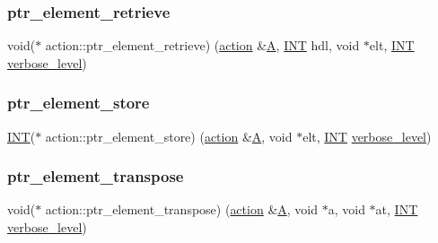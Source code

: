 \subsubsection{\texorpdfstring{ptr\+\_\+element\+\_\+retrieve}{ptr\_element\_retrieve}}
{\footnotesize\ttfamily void($\ast$ action\+::ptr\+\_\+element\+\_\+retrieve) (\mbox{\hyperlink{classaction}{action}} \&\mbox{\hyperlink{simeon_8_c_a97833f04c3a9c008df5521a2fc291bb4}{A}}, \mbox{\hyperlink{galois_8h_a09fddde158a3a20bd2dcadb609de11dc}{I\+NT}} hdl, void $\ast$elt, \mbox{\hyperlink{galois_8h_a09fddde158a3a20bd2dcadb609de11dc}{I\+NT}} \mbox{\hyperlink{simeon_8_c_a818073fbcc2f439e7c56952f67386122}{verbose\+\_\+level}})}

\mbox{\label{classaction_af0d51728258739fb3545b462159c4d1b}} 
\subsubsection{\texorpdfstring{ptr\+\_\+element\+\_\+store}{ptr\_element\_store}}
{\footnotesize\ttfamily \mbox{\hyperlink{galois_8h_a09fddde158a3a20bd2dcadb609de11dc}{I\+NT}}($\ast$ action\+::ptr\+\_\+element\+\_\+store) (\mbox{\hyperlink{classaction}{action}} \&\mbox{\hyperlink{simeon_8_c_a97833f04c3a9c008df5521a2fc291bb4}{A}}, void $\ast$elt, \mbox{\hyperlink{galois_8h_a09fddde158a3a20bd2dcadb609de11dc}{I\+NT}} \mbox{\hyperlink{simeon_8_c_a818073fbcc2f439e7c56952f67386122}{verbose\+\_\+level}})}

\mbox{\label{classaction_a31871fd83fe861d92c285edce5ba18a4}} 
\subsubsection{\texorpdfstring{ptr\+\_\+element\+\_\+transpose}{ptr\_element\_transpose}}
{\footnotesize\ttfamily void($\ast$ action\+::ptr\+\_\+element\+\_\+transpose) (\mbox{\hyperlink{classaction}{action}} \&\mbox{\hyperlink{simeon_8_c_a97833f04c3a9c008df5521a2fc291bb4}{A}}, void $\ast$a, void $\ast$at, \mbox{\hyperlink{galois_8h_a09fddde158a3a20bd2dcadb609de11dc}{I\+NT}} \mbox{\hyperlink{simeon_8_c_a818073fbcc2f439e7c56952f67386122}{verbose\+\_\+level}})}

